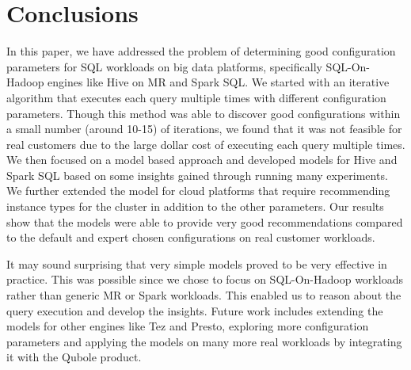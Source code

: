 \section{Conclusions}
\label{sec:conclusions}
In this paper, we have addressed the problem of determining good configuration parameters for SQL workloads on big data platforms, specifically SQL-On-Hadoop engines like Hive on MR and Spark SQL. We started with an iterative algorithm that executes each query multiple times with different configuration parameters. Though this method was able to discover good configurations within a small number (around 10-15) of iterations, we found that it was not feasible for real customers due to the large dollar cost of executing each query multiple times. We then focused on a model based approach and developed models for Hive and Spark SQL based on some insights gained through running many experiments. We further extended the model for cloud platforms that require recommending instance types for the cluster in addition to the other parameters. Our results show that the models were able to provide very good recommendations compared to the default and expert chosen configurations on real customer workloads. 

It may sound surprising that very simple models proved to be very effective in practice. This was possible since we chose to focus on SQL-On-Hadoop workloads rather than generic MR or Spark workloads. This enabled us to reason about the query execution and develop the insights. Future work includes extending the models for other engines like Tez and Presto, exploring more configuration parameters and applying the models on many more real workloads by integrating it with the Qubole product. 
